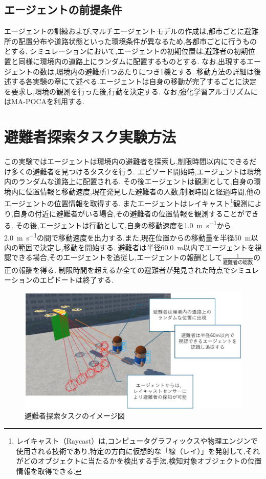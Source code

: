 \subsection{エージェントの前提条件}
エージェントの訓練および,マルチエージェントモデルの作成は,都市ごとに避難所の配置分布や道路状態といった環境条件が異なるため,各都市ごとに行うものとする.
シミュレーションにおいて,エージェントの初期位置は,避難者の初期位置と同様に環境内の道路上にランダムに配置するものとする.
なお,出現するエージェントの数は,環境内の避難所1つあたりにつき1機とする.
移動方法の詳細は後述する各実験の章にて述べる.エージェントは自身の移動が完了するごとに決定を要求し,環境の観測を行った後,行動を決定する.
なお,強化学習アルゴリズムにはMA-POCAを利用する.


\section{避難者探索タスク実験方法}
この実験ではエージェントは環境内の避難者を探索し,制限時間以内にできるだけ多くの避難者を見つけるタスクを行う.
エピソード開始時,エージェントは環境内のランダムな道路上に配置される.
その後エージェントは観測として,自身の環境内に位置情報と移動速度,現在発見した避難者の人数,制限時間と経過時間,他のエージェントの位置情報を取得する.
またエージェントはレイキャスト\footnote{レイキャスト（Raycast）は,コンピュータグラフィックスや物理エンジンで使用される技術であり,特定の方向に仮想的な「線（レイ）」を発射して,それがどのオブジェクトに当たるかを検出する手法.検知対象オブジェクトの位置情報を取得できる.}観測により,自身の付近に避難者がいる場合,その避難者の位置情報を観測することができる.
その後,エージェントは行動として,自身の移動速度を\SI{1.0}{\meter\per\second}から\SI{2.0}{\meter\per\second}の間で移動速度を出力する.また,現在位置からの移動量を半径\SI{50}{\meter}以内の範囲で決定し,移動を開始する.
避難者は半径\SI{60.0}{\meter}以内でエージェントを視認できる場合,そのエージェントを追従し,エージェントの報酬として$\frac{1}{避難者の総数}$の正の報酬を得る.
制限時間を超えるか全ての避難者が発見された時点でシミュレーションのエピドートは終了する.
\begin{figure}[H] 
  \centering 
  \includegraphics[width=1.0\textwidth]{Figures/SearchEx.png}
  \caption{避難者探索タスクのイメージ図} 
  \label{fig:01} 
\end{figure}
